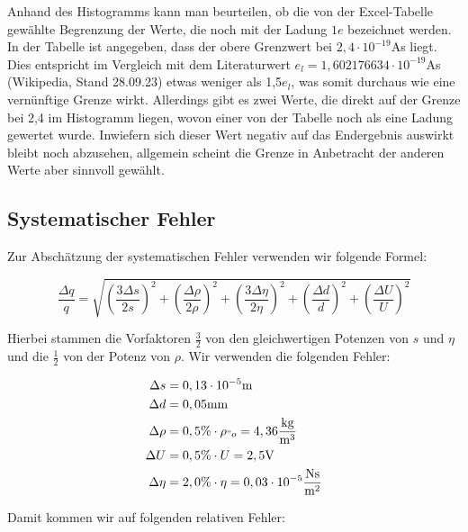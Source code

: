 \documentclass{article}
\begin{document}
Anhand des Histogramms kann man beurteilen, ob die von der Excel-Tabelle gewählte Begrenzung der Werte, die noch mit der Ladung $1e$ bezeichnet werden. In der Tabelle ist angegeben, dass der obere Grenzwert bei $2,4 \cdot 10^{-19}$As liegt. Dies entspricht im Vergleich mit dem Literaturwert $e_l = 1,602176634 \cdot 10^{-19}$As (Wikipedia, Stand 28.09.23) etwas weniger als 1,5$e_l$, was somit durchaus wie eine vernünftige Grenze wirkt. Allerdings gibt es zwei Werte, die direkt auf der Grenze bei 2,4 im Histogramm liegen, wovon einer von der Tabelle noch als eine Ladung gewertet wurde. Inwiefern sich dieser Wert negativ auf das Endergebnis auswirkt bleibt noch abzusehen, allgemein scheint die Grenze in Anbetracht der anderen Werte aber sinnvoll gewählt.

\subsection{Systematischer Fehler}

Zur Abschätzung der systematischen Fehler verwenden wir folgende Formel:

\begin{equation}
    \frac{\Delta q}{q} = \sqrt{\left( \frac{3\Delta s}{2s} \right)^2 + \left( \frac{\Delta \rho}{2 \rho} \right)^2 + \left( \frac{3 \Delta \eta}{2 \eta} \right)^2 + \left( \frac{\Delta d}{d} \right)^2 + \left( \frac{\Delta U}{U} \right)^2}
\end{equation}

Hierbei stammen die Vorfaktoren $\frac{3}{2}$ von den gleichwertigen Potenzen von $s$ und $\eta$ und die $\frac{1}{2}$ von der Potenz von $\rho$. Wir verwenden die folgenden Fehler:

\begin{equation}
    \begin{split}
        \Delta s &= 0,13 \cdot 10^{-5}\text{m} \\
        \Delta d &= 0,05 \text{mm} \\
        \Delta \rho &= 0,5\% \cdot \rho_{"o} = 4,36 \frac{\text{kg}}{\text{m}^3} \\
        \Delta U &= 0,5 \% \cdot U = 2,5 \text{V} \\
        \Delta \eta &= 2,0 \% \cdot \eta = 0,03 \cdot 10^{-5} \frac{\text{Ns}}{\text{m}^2} \\
    \end{split}
\end{equation}

Damit kommen wir auf folgenden relativen Fehler:
\end{document}
